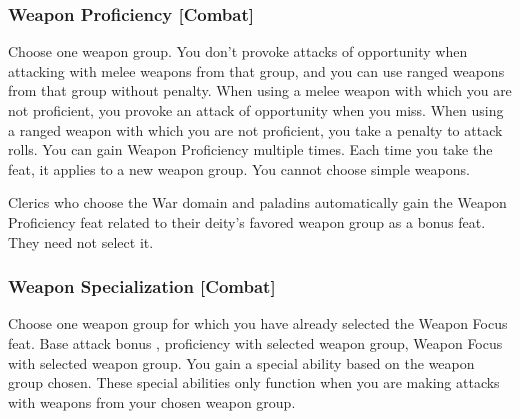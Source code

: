 \subsubsection{Weapon Proficiency [Combat]}
Choose one weapon group.
 You don't provoke attacks of opportunity when attacking with melee weapons from that group, and you can use ranged weapons from that group without penalty.
 When using a melee weapon with which you are not proficient, you provoke an attack of opportunity when you miss. When using a ranged weapon with which you are not proficient, you take a  penalty to attack rolls.
 You can gain Weapon Proficiency multiple times. Each time you take the feat, it applies to a new weapon group. You cannot choose simple weapons.
\par Clerics who choose the War domain and paladins automatically gain the Weapon Proficiency feat related to their deity's favored weapon group as a bonus feat. They need not select it.

\subsubsection{Weapon Specialization [Combat]}
Choose one weapon group for which you have already selected the Weapon Focus feat.
 Base attack bonus , proficiency with selected weapon group, Weapon Focus with selected weapon group.
\featben You gain a special ability based on the weapon group chosen. These special abilities only function when you are making attacks with weapons from your chosen weapon group.

